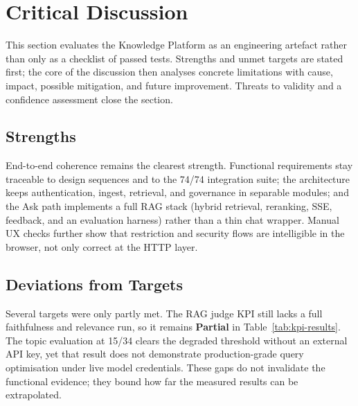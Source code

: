 
\section{Critical Discussion}
\label{sec:critical-discussion}

This section evaluates the Knowledge Platform as an engineering artefact rather
than only as a checklist of passed tests. Strengths and unmet targets are stated
first; the core of the discussion then analyses concrete limitations with cause,
impact, possible mitigation, and future improvement. Threats to validity and a
confidence assessment close the section.

\subsection{Strengths}

End-to-end coherence remains the clearest strength. Functional requirements stay
traceable to design sequences and to the 74/74 integration suite; the architecture
keeps authentication, ingest, retrieval, and governance in separable modules; and
the Ask path implements a full RAG stack (hybrid retrieval, reranking, SSE,
feedback, and an evaluation harness) rather than a thin chat wrapper. Manual UX
checks further show that restriction and security flows are intelligible in the
browser, not only correct at the HTTP layer.

\subsection{Deviations from Targets}

Several targets were only partly met. The RAG judge KPI still lacks a full
faithfulness and relevance run, so it remains \textbf{Partial} in
Table~\ref{tab:kpi-results}. The topic evaluation at 15/34 clears the degraded
threshold without an external API key, yet that result does not demonstrate
production-grade query optimisation under live model credentials. These gaps do
not invalidate the functional evidence; they bound how far the measured results
can be extrapolated.

